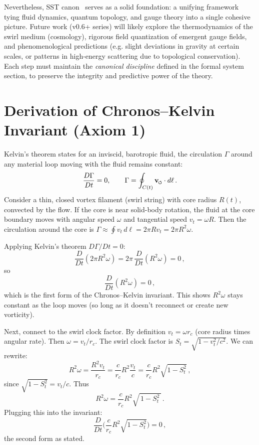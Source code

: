 \documentclass[reprint,aps,onecolumn,nofootinbib]{revtex4-2}
\newcommand{\swirlarrow}{%
    \mathchoice{\mkern-2mu\scriptstyle\boldsymbol{\circlearrowleft}}%
    {\mkern-2mu\scriptstyle\boldsymbol{\circlearrowleft}}%
    {\mkern-2mu\scriptscriptstyle\boldsymbol{\circlearrowleft}}%
    {\mkern-2mu\scriptscriptstyle\boldsymbol{\circlearrowleft}}%
}
\newcommand{\vswirl}{\mathbf{v}_{\swirlarrow}}
\begin{document}
	Nevertheless, SST canon \canonversion \ serves as a solid foundation: a unifying framework tying fluid dynamics, quantum topology, and gauge theory into a single cohesive picture. Future work (v0.6+ series) will likely explore the thermodynamics of the swirl medium (cosmology), rigorous field quantization of emergent gauge fields, and phenomenological predictions (e.g. slight deviations in gravity at certain scales, or patterns in high-energy scattering due to topological conservation). Each step must maintain the \emph{canonical discipline} defined in the formal system section, to preserve the integrity and predictive power of the theory.


	\appendix
	\section{Derivation of Chronos–Kelvin Invariant (Axiom 1)}
	Kelvin’s theorem states for an inviscid, barotropic fluid, the circulation $\Gamma$ around any material loop moving with the fluid remains constant:
	\[
		\frac{D\Gamma}{Dt} = 0, \qquad \Gamma = \oint_{C(t)} \vswirl \cdot d\ell\,.
	\]
	Consider a thin, closed vortex filament (swirl string) with core radius $R(t)$, convected by the flow. If the core is near solid-body rotation, the fluid at the core boundary moves with angular speed $\omega$ and tangential speed $v_t = \omega R$. Then the circulation around the core is $\Gamma \approx \oint v_t\,d\ell = 2\pi R v_t = 2\pi R^2 \omega$.

	Applying Kelvin’s theorem $D\Gamma/Dt=0$:
	\[
		\frac{D}{Dt}(2\pi R^2 \omega) = 2\pi\,\frac{D}{Dt}(R^2 \omega) = 0\,,
	\]
	so
	\[
		\frac{D}{Dt}(R^2 \omega) = 0\,,
	\]
	which is the first form of the Chronos–Kelvin invariant. This shows $R^2 \omega$ stays constant as the loop moves (so long as it doesn’t reconnect or create new vorticity).

	Next, connect to the swirl clock factor. By definition $v_t = \omega r_c$ (core radius times angular rate). Then $\omega = v_t/r_c$. The swirl clock factor is $S_t = \sqrt{1 - v_t^2/c^2}$. We can rewrite:
	\[
		R^2 \omega = \frac{R^2 v_t}{r_c} = \frac{c}{r_c} R^2 \frac{v_t}{c} = \frac{c}{r_c} R^2 \sqrt{1 - S_t^2}\,,
	\]
	since $\sqrt{1 - S_t^2} = v_t/c$. Thus
	\[
		R^2 \omega = \frac{c}{r_c} R^2 \sqrt{\,1 - S_t^2\,}\,.
	\]
	Plugging this into the invariant:
	\[
		\frac{D}{Dt}\Big(\frac{c}{r_c} R^2 \sqrt{1 - S_t^2}\Big) = 0\,,
	\]
	the second form as stated.
\end{document}
